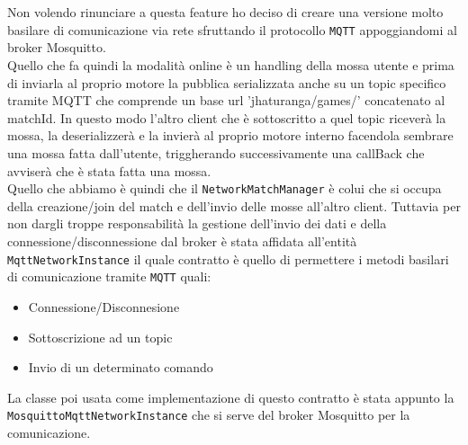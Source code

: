 \documentclass[a4paper,12pt]{report}
\begin{document}
\paragraph{}
\
\\
Non volendo rinunciare a questa feature ho deciso di creare una versione molto basilare di comunicazione via rete sfruttando il protocollo \texttt{MQTT} appoggiandomi al broker Mosquitto.
\\
Quello che fa quindi la modalità online è un handling della mossa utente e prima di inviarla al proprio motore la pubblica serializzata anche su un topic specifico tramite MQTT che comprende un base url 'jhaturanga/games/' concatenato al matchId.
In questo modo l'altro client che è sottoscritto a quel topic riceverà la mossa, la deserializzerà e la invierà al proprio motore interno facendola sembrare una mossa fatta dall'utente, triggherando successivamente una callBack che avviserà che è stata fatta una mossa.
\\
Quello che abbiamo è quindi che il \texttt{NetworkMatchManager} è colui che si occupa della creazione/join del match e dell'invio delle mosse all'altro client.
Tuttavia per non dargli troppe responsabilità la gestione dell'invio dei dati e della connessione/disconnessione dal broker è stata affidata all'entità \texttt{MqttNetworkInstance} il quale contratto è quello di permettere i metodi basilari di comunicazione tramite \texttt{MQTT} quali:
\begin{itemize}
    \item Connessione/Disconnesione
    \item Sottoscrizione ad un topic
    \item Invio di un determinato comando
\end{itemize}
La classe poi usata come implementazione di questo contratto è stata appunto la \texttt{MosquittoMqttNetworkInstance} che si serve del broker Mosquitto per la comunicazione.
\end{document}
